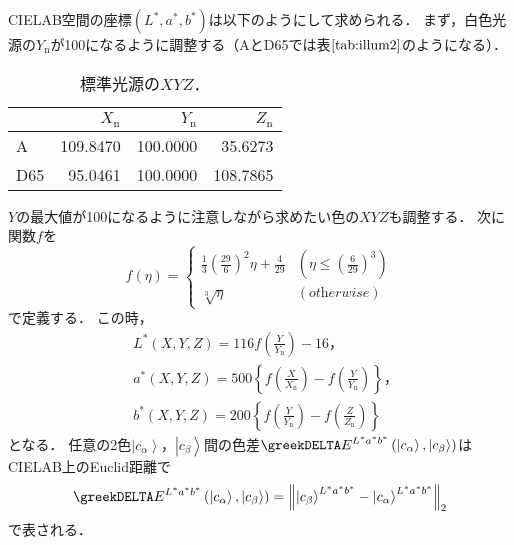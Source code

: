 \documentclass[uplatex,paper=a4,fontsize=4.0truemm,jafontsize=4.0truemm,head_space=30.0truemm,foot_space=30.0truemm,baselineskip=8.0truemm,line_length=40zw,gutter=25.0truemm,oneside,openany,fleqn,hanging_panctuation,open_bracket_pos=nibu_tentsuki,dvipdfmx,jis2004,book,titlepage]{jlreq}
\theoremstyle{mystyle}
\newcommand{\captiondot}[1]{\caption{#1．}}
\newcommand{\tableinput}[4]{\begin{table}[tbp]\centering\captiondot{#3}\label{tab:#4}\begin{tabular}{#1}#2\end{tabular}\end{table}}
\newcommand{\mathdisplaystyle}[1]{\(\displaystyle{#1}\)}
\newcommand{\Reference}[1]{\mathdisplaystyle{\ref{#1}}}
\newcommand{\fraction}[2]{\displaystyle{\frac{\displaystyle{#1}}{\displaystyle{#2}}}}
\newcommand{\parentheses}[1]{\left(#1\right)}
\newcommand{\braces}[1]{\left\{#1\right\}}
\newcommand{\norm}[2]{{\left\lVert#1\right\rVert}_{#2}}
\newcommand{\Diracket}[1]{\left\lvert#1\right\rangle}
\begin{document}
			CIELAB空間の座標\mathdisplaystyle{\parentheses{L^\ast,a^\ast,b^\ast}}は以下のようにして求められる．
			まず，白色光源の\mathdisplaystyle{Y_\textrm{n}}が100になるように調整する（AとD65では表\Reference{tab:illum2}のようになる）．
			\tableinput{l|rrr}{ & \(X_\textrm{n}\) & \(Y_\textrm{n}\) & \(Z_\textrm{n}\) \\ \hline
				A & 109.8470 & 100.0000 & 35.6273 \\
				D65 & 95.0461 & 100.0000 & 108.7865}{標準光源の\mathdisplaystyle{XYZ}}{illum2}
			\mathdisplaystyle{Y}の最大値が100になるように注意しながら求めたい色の\mathdisplaystyle{XYZ}も調整する．
			次に関数\mathdisplaystyle{f}を
			\begin{equation*}
				f\parentheses{\eta}=\begin{cases}
					\fraction{1}{3}\parentheses{\fraction{29}{6}}^2\eta+\fraction{4}{29} & \parentheses{\eta\leq\parentheses{\fraction{6}{29}}^3} \\
					\sqrt[3]{\eta} & \parentheses{\textit{otherwise}}
				\end{cases}
			\end{equation*}
			で定義する．
			この時，
			\begin{align*}
				&L^\ast\parentheses{X,Y,Z}=116f\parentheses{\fraction{Y}{Y_\textrm{n}}}-16\textrm{，}\\
				&a^\ast\parentheses{X,Y,Z}=500\braces{f\parentheses{\fraction{X}{X_\textrm{n}}}-f\parentheses{\fraction{Y}{Y_\textrm{n}}}}\textrm{，}\\
				&b^\ast\parentheses{X,Y,Z}=200\braces{f\parentheses{\fraction{Y}{Y_\textrm{n}}}-f\parentheses{\fraction{Z}{Z_\textrm{n}}}}
			\end{align*}
			となる．
			任意の2色\mathdisplaystyle{\Diracket{c_\alpha}}，\mathdisplaystyle{\Diracket{c_\beta}}間の色差\mathdisplaystyle{\greekDELTA E^{L^\ast a^\ast b^\ast}\parentheses{\Diracket{c_\alpha},\Diracket{c_\beta}}}はCIELAB上のEuclid距離で
			\begin{equation}
				\greekDELTA E^{L^\ast a^\ast b^\ast}\parentheses{\Diracket{c_\alpha},\Diracket{c_\beta}}=\norm{\Diracket{c_\beta}^{L^\ast a^\ast b^\ast}-\Diracket{c_\alpha}^{L^\ast a^\ast b^\ast}}{2}\label{eq:LAB}
			\end{equation}
			で表される．
\end{document}
